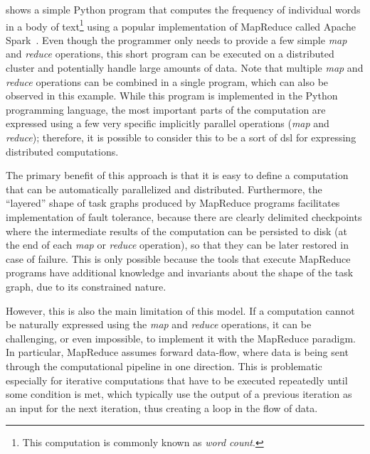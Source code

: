  shows a simple Python program that computes the frequency of
individual words in a body of text\footnote{This computation is commonly known as \emph{word count}.} using a popular implementation of
MapReduce called Apache Spark~\cite{spark}. Even though the programmer only needs to
provide a few simple \emph{map} and \emph{reduce} operations, this short
program can be executed on a distributed cluster and potentially handle large amounts of data. Note
that multiple \emph{map} and \emph{reduce} operations can be combined in a
single program, which can also be observed in this example. While this program is implemented in
the Python programming language, the most important parts of the computation are expressed using a
few very specific implicitly parallel operations (\emph{map} and
\emph{reduce}); therefore, it is possible to consider this to be a sort of
\gls{dsl} for expressing distributed computations.

The primary benefit of this approach is that it is easy to define a computation that can be
automatically parallelized and distributed. Furthermore, the ``layered'' shape of task graphs
produced by MapReduce programs facilitates implementation of fault tolerance, because there are
clearly delimited checkpoints where the intermediate results of the computation can be persisted to
disk (at the end of each \emph{map} or \emph{reduce} operation), so that
they can be later restored in case of failure. This is only possible because the tools that execute
MapReduce programs have additional knowledge and invariants about the shape of the task graph, due
to its constrained nature.

However, this is also the main limitation of this model. If a computation cannot be naturally
expressed using the \emph{map} and \emph{reduce} operations, it can be
challenging, or even impossible, to implement it with the MapReduce paradigm. In particular,
MapReduce assumes forward data-flow, where data is being sent through the computational pipeline in
one direction. This is problematic especially for iterative computations that have to be executed
repeatedly until some condition is met, which typically use the output of a previous iteration as
an input for the next iteration, thus creating a loop in the flow of data.


